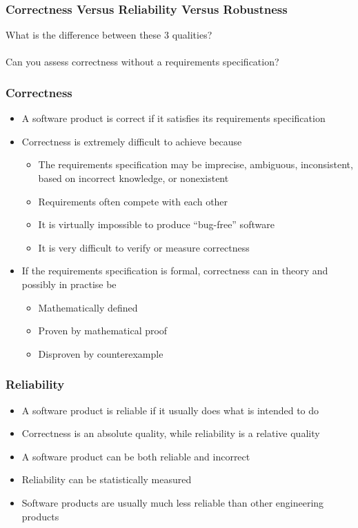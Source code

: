\documentclass[t,12pt,numbers,fleqn]{beamer}
\begin{document}

\begin{frame}
\frametitle{Correctness Versus Reliability Versus Robustness}

What is the difference between these 3 qualities?\\
~\\
Can you assess correctness without a requirements specification?

\end{frame}


\begin{frame}
\frametitle{Correctness}

\begin{itemize}
\item A software product is correct if it satisfies its requirements specification
\item Correctness is extremely difficult to achieve because
\begin{itemize}
\item The requirements specification may be imprecise, ambiguous, inconsistent,
  based on incorrect knowledge, or nonexistent
\item Requirements often compete with each other
\item It is virtually impossible to produce ``bug-free'' software
\item It is very difficult to verify or measure correctness
\end{itemize}
\item If the requirements specification is formal, correctness can in theory and
  possibly in practise be
\begin{itemize}
\item Mathematically defined
\item Proven by mathematical proof
\item Disproven by counterexample
\end{itemize}
\end{itemize}

\end{frame}


\begin{frame}
\frametitle{Reliability}

\begin{itemize}
\item A software product is reliable if it usually does what is intended to do
\item Correctness is an absolute quality, while reliability is a relative quality
\item A software product can be both reliable and incorrect
\item Reliability can be statistically measured
\item Software products are usually much less reliable than other engineering
  products
\end{itemize}

\end{frame}
\end{document}
